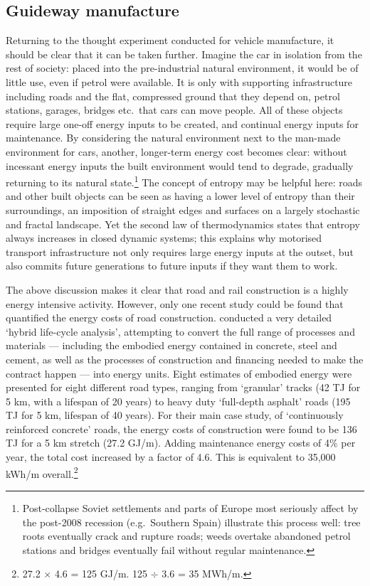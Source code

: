 \documentclass[a4paper, 11pt, twoside]{Thesis}
\begin{document}
\subsection{Guideway manufacture} 
Returning to the thought experiment conducted for vehicle manufacture, it
should be clear that it can be taken further. Imagine the car in isolation
from the rest of society: placed into the pre-industrial natural environment,
it would be of little use, even if petrol were available.
It is only with supporting infrastructure including roads and the flat,
compressed ground that they depend on, petrol stations, garages, bridges
etc.~that cars can move people. All of these objects require large one-off
energy inputs to be created, and continual energy inputs for maintenance. By
considering the natural environment next to the
man-made environment for cars, another, longer-term energy cost becomes clear:
without incessant energy inputs the built environment would tend to degrade,
gradually returning to its natural
state.\footnote{Post-collapse Soviet settlements
and parts of Europe most seriously affect by the post-2008 recession
(e.g.~Southern Spain)
illustrate this process well: tree roots eventually crack and rupture roads;
weeds overtake abandoned petrol stations and bridges eventually fail without
regular maintenance.
}
The concept of entropy may be helpful here: roads and other built objects
can be seen as having a lower level of entropy than their surroundings, an
imposition of straight edges and surfaces on a largely stochastic and fractal
landscape. Yet the second law of thermodynamics states that entropy always
increases in closed dynamic systems; this explains why motorised transport
infrastructure not only requires large energy inputs at the outset, but also
commits future generations to future inputs if they want them to work.

The above discussion makes it clear that road and rail construction is a
highly energy intensive activity. However, only one recent study could be
found that quantified the energy costs of road construction.
\citet{Treloar2004} conducted a very detailed `hybrid life-cycle analysis',
attempting to convert the full range of processes and materials
--- including the embodied energy contained in concrete, steel and cement, as
well as the processes of construction and financing needed to make the
contract happen --- into energy units. Eight estimates of embodied energy
were presented for eight different road types, ranging from `granular'
tracks (42 TJ for 5 km, with a lifespan of 20 years) to heavy duty
`full-depth asphalt' roads (195 TJ for 5 km, lifespan of 40 years).
For their main case study, of `continuously reinforced concrete' roads,
the energy costs of construction were found to be 136 TJ for a 5 km stretch
(27.2 GJ/m). Adding maintenance energy costs of 4\%  per year, the total
cost increased by a factor of 4.6. This is equivalent to 35,000 kWh/m
overall.\footnote{27.2 
$\times$ 4.6 = 125 GJ/m. 125 $\div$ 3.6 = 35 MWh/m.
}
\end{document}
